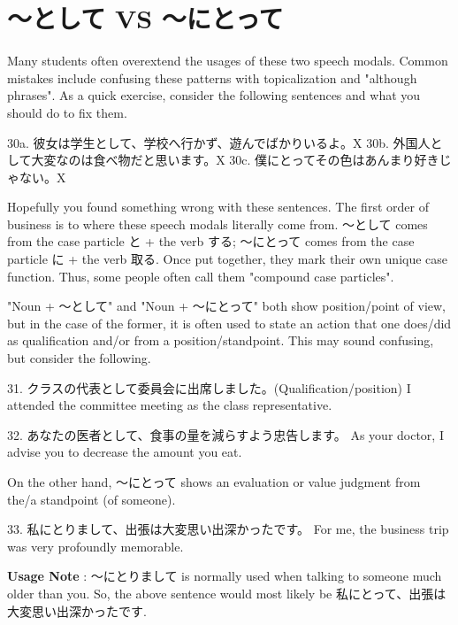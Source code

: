\section{～として VS ～にとって}
 
\par{ Many students often overextend the usages of these two speech modals. Common mistakes include confusing these patterns with topicalization and "although phrases". As a quick exercise, consider the following sentences and what you should do to fix them. }

\par{30a. 彼女は学生として、学校へ行かず、遊んでばかりいるよ。X \hfill\break
30b. 外国人として大変なのは食べ物だと思います。X \hfill\break
30c. 僕にとってその色はあんまり好きじゃない。X }

\par{ Hopefully you found something wrong with these sentences. The first order of business is to where these speech modals literally come from. ～として comes from the case particle と + the verb する; ～にとって comes from the case particle に + the verb 取る. Once put together, they mark their own unique case function. Thus, some people often call them "compound case particles". }

\par{ "Noun + ～として" and "Noun + ～にとって" both show position\slash point of view, but in the case of the former, it is often used to state an action that one does\slash did as qualification and\slash or from a position\slash standpoint. This may sound confusing, but consider the following. }

\par{31. クラスの代表として委員会に出席しました。(Qualification\slash position) \hfill\break
I attended the committee meeting as the class representative. }

\par{32. あなたの医者として、食事の量を減らすよう忠告します。 \hfill\break
As your doctor, I advise you to decrease the amount you eat. }

\par{ On the other hand, ～にとって shows an evaluation or value judgment from the\slash a standpoint (of someone). }

\par{33. 私にとりまして、出張は大変思い出深かったです。 \hfill\break
For me, the business trip was very profoundly memorable. }
 
\par{\textbf{Usage Note }: ～にとりまして is normally used when talking to someone much older than you. So, the above sentence would most likely be 私にとって、出張は大変思い出深かったです. }


